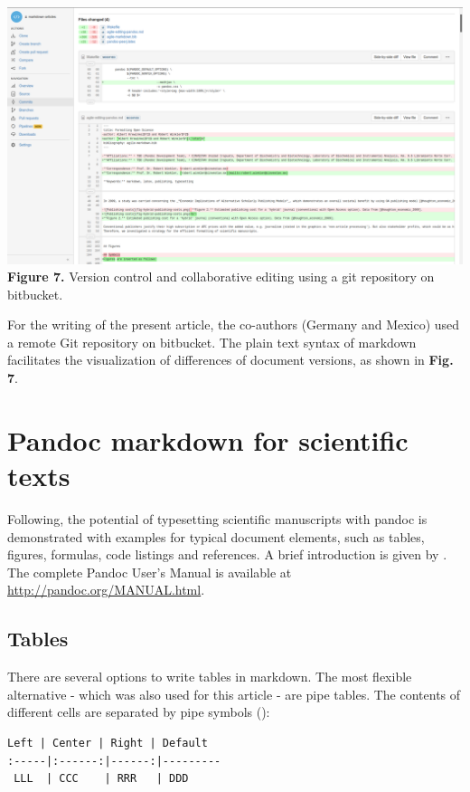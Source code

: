 \documentclass[10pt,fleqn]{wlpeerj}
\begin{document}
\includegraphics{fig-bitbucket-diff.png}
\textbf{Figure
7.}
Version
control
and
collaborative
editing
using
a git
repository
on
bitbucket.

For
the
writing
of
the
present
article,
the
co-authors
(Germany
and
Mexico)
used
a
remote
Git
repository
on
bitbucket.
The
plain
text
syntax
of
markdown
facilitates
the
visualization
of
differences
of
document
versions,
as
shown
in
\textbf{Fig.
7}.

\section{Pandoc
markdown
for
scientific
texts}\label{pandoc-markdown-for-scientific-texts}

Following,
the
potential
of
typesetting
scientific
manuscripts
with
pandoc
is
demonstrated
with
examples
for
typical
document
elements,
such
as
tables,
figures,
formulas,
code
listings
and
references.
A
brief
introduction
is
given
by
\citep{dominici_pandoc_2014}.
The
complete
Pandoc
User's
Manual
is
available
at
\url{http://pandoc.org/MANUAL.html}.

\subsection{Tables}\label{tables}

There
are
several
options
to
write
tables
in
markdown.
The
most
flexible
alternative
-
which
was
also
used
for
this
article
- are
pipe
tables.
The
contents
of
different
cells
are
separated
by
pipe
symbols
(\texttt{\textbar{}}):

\begin{verbatim}
Left | Center | Right | Default
:-----|:------:|------:|---------
 LLL  | CCC    | RRR   | DDD
\end{verbatim}
\end{document}
